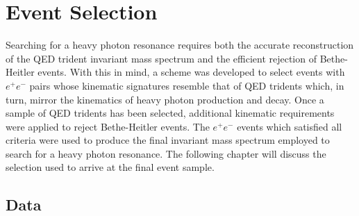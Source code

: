 %
%
%
%
\chapter{Event Selection} \label{ch:event_selection}

Searching for a heavy photon resonance requires both the accurate 
reconstruction of the QED trident invariant mass spectrum and the efficient 
rejection of Bethe-Heitler events.  With this in mind, a scheme 
was developed to select events with $e^+e^-$ pairs whose kinematic signatures
resemble that of QED tridents which, in turn, mirror the kinematics of 
heavy photon production and decay.  Once a sample of QED tridents has been selected, 
additional kinematic 
requirements were applied to reject Bethe-Heitler events.  The  $e^+e^-$ events
which satisfied all criteria were used to produce the final invariant mass 
spectrum employed to search for a heavy photon resonance.  The following chapter
will discuss the selection used to arrive at the final event sample.   


\section{Data}

